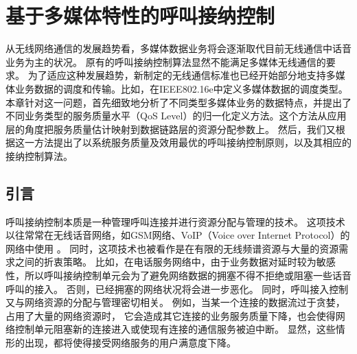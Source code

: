 \graphicspath{ {../body/cacop_figures/}}
\chapter{基于多媒体特性的呼叫接纳控制}
\label{chap_cacop}

从无线网络通信的发展趋势看，多媒体数据业务将会逐渐取代目前无线通信中话音业务为主的状况。
原有的呼叫接纳控制算法显然不能满足多媒体无线通信的要求。
为了适应这种发展趋势，新制定的无线通信标准也已经开始部分地支持多媒体业务数据的调度和传输。比如，在IEEE802.16e中定义多媒体数据的调度类型。
本章针对这一问题，首先细致地分析了不同类型多媒体业务的数据特点，并提出了不同业务类型的服务质量水平（QoS Level）的归一化定义方法。这个方法从应用层的角度把服务质量估计映射到数据链路层的资源分配参数上。
然后，我们又根据这一方法提出了以系统服务质量及效用最优的呼叫接纳控制原则，以及其相应的接纳控制算法。

\section{引言}
呼叫接纳控制本质是一种管理呼叫连接并进行资源分配与管理的技术。
这项技术以往常常在无线话音网络，如GSM网络、VoIP（Voice over Internet Protocol）的网络中使用\cite{Perros1996}\cite{Mase2004}
\cite{Systems_2001}\cite{Y-G-Fang.TVT.2002}\cite{Y-Xiao.IEICE.TC.2001}。
同时，这项技术也被看作是在有限的无线频谱资源与大量的资源需求之间的折衷策略。
比如，在电话服务网络中，由于业务数据对延时较为敏感性，所以呼叫接纳控制单元会为了避免网络数据的拥塞不得不拒绝或阻塞一些话音呼叫的接入。
否则，已经拥塞的网络状况将会进一步恶化。
同时，呼叫接入控制又与网络资源的分配与管理密切相关。
例如，当某一个连接的数据流过于贪婪，占用了大量的网络资源时，
它会造成其它连接的业务服务质量下降，也会使得网络控制单元阻塞新的连接进入或使现有连接的通信服务被迫中断。
显然，这些情形的出现，都将使得接受网络服务的用户满意度下降。

